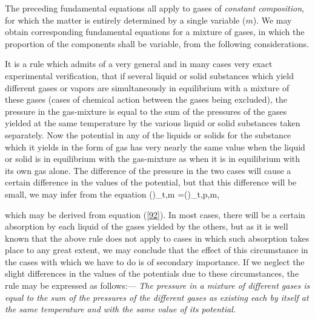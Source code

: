 \documentclass[12pt]{article}
\begin{document}
\par The preceding fundamental equations all apply to gases of \textit{constant composition}, for which the matter is entirely determined by a single variable ($m$). We may obtain corresponding fundamental equations for a mixture of gases, in which the proportion of the components shall be variable, from  the following considerations.


It is a rule which admits of a very general and in many cases very exact experimental verification, that if several liquid or solid substances which yield different gases or vapors are simultaneously in equilibrium with a mixture of these gases (cases of chemical action between the gases being excluded), the pressure in the gas-mixture is equal to the sum of the pressures of the gases yielded at the same temperature by the various liquid or solid substances taken separately. Now the potential in any of the liquids or solids for the substance which it yields in the form of gas has very nearly the same value when the liquid or solid is in equilibrium with the gas-mixture as when it is in equilibrium with its own gas alone. The difference of the pressure in the two cases will cause a certain difference in the values of the potential, but that this difference will be small, we may infer from the equation
\eqs 
\left(\right)_{t,m} =\left(\right)_{t,p,m},       \label{272}\eqe

which may be derived from equation (\ref{92}). In most cases, there will be a certain absorption by each liquid of the gases yielded by the others, but as it is well known that the above rule does not apply to cases in which such absorption takes place to any great extent, we may conclude that the effect of this circumstance in the cases with which we have to do is of secondary importance. If we neglect the slight differences in the values of the potentials due to these circumstances, the rule may be expressed as follows:---
\textit{The pressure in a mixture of different gases is equal to the sum of the pressures of the different gases as existing each by itself at the same temperature and with the same value of its potential.}
\end{document}
